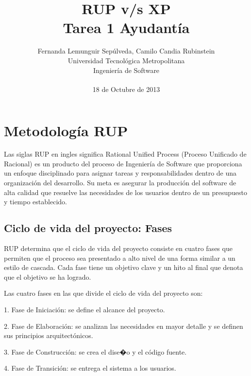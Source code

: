 \documentclass{article}
\title{ RUP v/s XP \\ Tarea 1 Ayudant\'ia}
\author{Fernanda Lemunguir Sep\'ulveda, Camilo Candia Rubinstein\\
  \small Universidad Tecnol\'ogica Metropolitana\\
  \small Ingenier\'ia de Software\\
  \date\small{18 de Octubre de 2013}
}
\begin{document}
\maketitle


\section{Metodolog\'ia RUP}

 Las siglas RUP en ingles significa Rational Unified Process (Proceso Unificado de Racional) es un producto del proceso de Ingenier\'ia de Software que proporciona un enfoque disciplinado para asignar tareas y responsabilidades dentro de una organizaci\'on del desarrollo. Su meta es asegurar la producci\'on del software de alta calidad que resuelve las necesidades de los usuarios dentro de un presupuesto y tiempo establecido.

\subsection{Ciclo de vida del proyecto: Fases}
RUP determina que el ciclo de vida del proyecto consiste en cuatro fases que permiten que el proceso sea presentado a alto nivel de una forma similar a un estilo de cascada. Cada fase tiene un objetivo clave y un hito al final que denota que el objetivo se ha logrado.

Las cuatro fases en las que divide el ciclo de vida del proyecto son:

1. Fase de Iniciaci\'on: se define el alcance del proyecto.

2. Fase de Elaboraci\'on: se analizan las necesidades en mayor detalle y se definen sus principios arquitect\'onicos.

3. Fase de Construcci\'on: se crea el dise�o y el c\'odigo fuente.

4. Fase de Transici\'on: se entrega el sistema a los usuarios.
\end{document}
